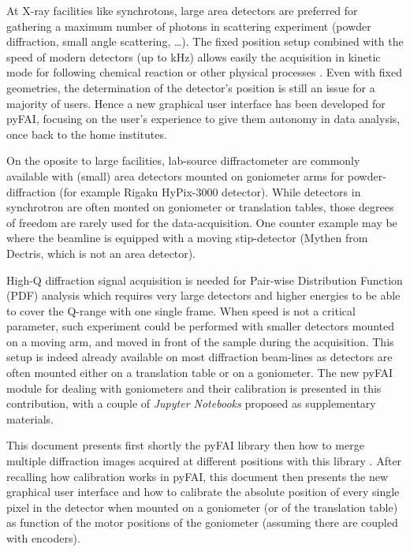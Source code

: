 \documentclass[preprint, pdf]{iucr}              %
\begin{document}
At X-ray facilities like synchrotons, large area detectors are 
preferred for gathering a maximum number of photons in
scattering experiment (powder diffraction, small angle
scattering, \ldots).
The fixed position setup combined with the speed of modern detectors (up
to kHz) allows easily the acquisition in kinetic mode for following chemical
reaction or other physical processes \cite{id15, id31}.
Even with fixed geometries, the determination of the detector's position is
still an issue for a majority of users. 
Hence a new graphical user interface has been developed for pyFAI, focusing
on the user's experience to give them autonomy in data analysis, once back to the
home institutes.


On the oposite to large facilities, lab-source diffractometer are commonly
available with (small) area detectors mounted on goniometer arms for
powder-diffraction (for example Rigaku HyPix-3000 detector).
While detectors in synchrotron are often monted on goniometer or translation
tables, those degrees of freedom are rarely used for the data-acquisition.  
One counter example may be \cite{Gao:kc5032} where the beamline is equipped with
a moving stip-detector (Mythen from Dectris, which is not an area detector).




High-Q diffraction signal acquisition is needed \cite{Chupas:wf5000} for
Pair-wise Distribution Function (PDF) analysis which requires very large
detectors and higher energies to be able to cover the Q-range with one single frame.
When speed is not a critical parameter, such experiment could be performed
with smaller detectors mounted on a moving arm, and moved in front of
the sample during the acquisition. 
This setup is indeed already available on most diffraction beam-lines as
detectors are often mounted either on a translation table or on a
goniometer. 
The new pyFAI module for dealing with goniometers and their calibration is
presented in this contribution, with a couple of \textit{Jupyter Notebooks}
\cite{ipython} proposed as supplementary materials.

This document presents first shortly the pyFAI library \cite{fv5028} then how to
merge multiple diffraction images acquired at different positions with this
library \cite{PyFAI_PDJ}. 
After recalling how calibration works in pyFAI, this document then 
presents the new graphical user interface and how to
calibrate the absolute position of every single pixel in the detector when
mounted on a goniometer (or of the translation table) as function of the  motor
positions of the goniometer (assuming there are coupled with encoders). 
\end{document}
